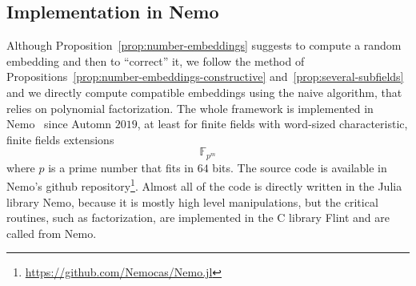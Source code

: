 \subsection{Implementation in Nemo}

Although Proposition~\ref{prop:number-embeddings} suggests to compute a random
embedding and then to ``correct'' it, we follow the method of
Propositions~\ref{prop:number-embeddings-constructive} and~\ref{prop:several-subfields} and
we directly compute compatible embeddings using the naive algorithm, that relies
on polynomial factorization. The whole framework is implemented in
Nemo~\cite{Nemo} since Automn $2019$, at least for finite fields with
word-sized characteristic, \ie finite fields extensions
\[
  \mathbb{F}_{p^m}
\]
where $p$ is a prime number that fits in $64$ bits. The source code is available
in Nemo's github repository\footnote{\url{https://github.com/Nemocas/Nemo.jl}}. Almost all of the code is
directly written in the Julia library Nemo, because it is mostly high level manipulations, but the
critical routines, such as factorization, are implemented in the C library Flint
and are called from Nemo.

